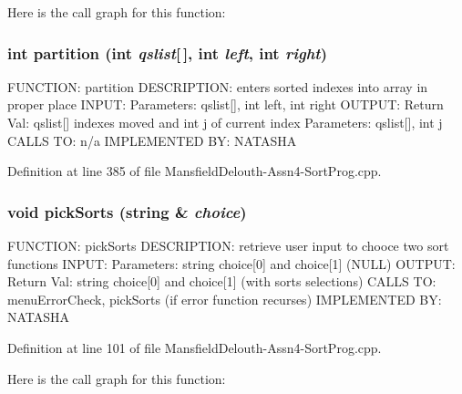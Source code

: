 Here is the call graph for this function:

\hypertarget{_mansfield_delouth-_assn4-_sort_prog_8cpp_af199bb360825bf6dbcb98371c70419e1}{
\subsubsection[{partition}]{\setlength{\rightskip}{0pt plus 5cm}int partition (int {\em qslist}\mbox{[}$\,$\mbox{]}, \/  int {\em left}, \/  int {\em right})}}
\label{_mansfield_delouth-_assn4-_sort_prog_8cpp_af199bb360825bf6dbcb98371c70419e1}
FUNCTION: partition DESCRIPTION: enters sorted indexes into array in proper place INPUT: Parameters: qslist\mbox{[}\mbox{]}, int left, int right OUTPUT: Return Val: qslist\mbox{[}\mbox{]} indexes moved and int j of current index Parameters: qslist\mbox{[}\mbox{]}, int j CALLS TO: n/a IMPLEMENTED BY: NATASHA 

Definition at line 385 of file MansfieldDelouth-\/Assn4-\/SortProg.cpp.

\hypertarget{_mansfield_delouth-_assn4-_sort_prog_8cpp_a401a41ad70746c8dd39ecc19286b5e38}{
\subsubsection[{pickSorts}]{\setlength{\rightskip}{0pt plus 5cm}void pickSorts (string \& {\em choice})}}
\label{_mansfield_delouth-_assn4-_sort_prog_8cpp_a401a41ad70746c8dd39ecc19286b5e38}
FUNCTION: pickSorts DESCRIPTION: retrieve user input to chooce two sort functions INPUT: Parameters: string choice\mbox{[}0\mbox{]} and choice\mbox{[}1\mbox{]} (NULL) OUTPUT: Return Val: string choice\mbox{[}0\mbox{]} and choice\mbox{[}1\mbox{]} (with sorts selections) CALLS TO: menuErrorCheck, pickSorts (if error function recurses) IMPLEMENTED BY: NATASHA 

Definition at line 101 of file MansfieldDelouth-\/Assn4-\/SortProg.cpp.



Here is the call graph for this function:

